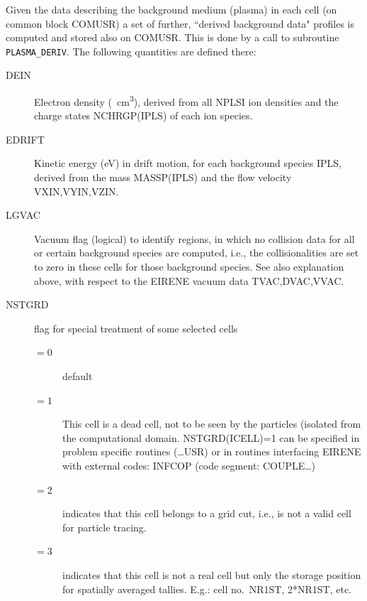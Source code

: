 Given the data describing the background medium (plasma) in each cell (on
common block COMUSR) a set of further, ``derived background data" profiles is
computed and stored also on COMUSR.
This is done by a call to subroutine \lstinline|PLASMA_DERIV|.
The following quantities are defined there:
\begin{description}
  \item[DEIN] Electron density (\si{\per\cubic\centi\metre}), derived from all
        NPLSI ion densities and the charge states NCHRGP(IPLS) of each ion species.
  \item[EDRIFT] Kinetic energy (\si{\electronvolt}) in drift motion, for each
        background species IPLS, derived from the mass MASSP(IPLS) and the flow
        velocity VXIN,VYIN,VZIN.
  \item[LGVAC] Vacuum flag (logical) to identify regions, in which no collision
        data for all or certain background species are computed, i.e., the
        collisionalities are set to zero in these cells for those background species.
        See also explanation above, with respect to the EIRENE vacuum data
        TVAC,DVAC,VVAC.
  \item[NSTGRD] flag for special treatment of some selected cells
        \begin{description}
          \item[$= 0$] default
          \item[$= 1$] This cell is a dead cell,
                not to be seen by the particles (isolated from the computational domain.
                NSTGRD(ICELL)=1 can be specified in problem specific routines (\dots USR) or in
                routines interfacing EIRENE with external codes: INFCOP (code segment:
                COUPLE\dots)
          \item[$= 2$] indicates that this cell belongs to a grid cut, i.e.,
                is not a valid cell for particle tracing.
          \item[$= 3$] indicates that this cell is not a real cell but only the storage
                position for spatially averaged tallies.
                E.g.: cell no.\ NR1ST, 2*NR1ST, etc.
        \end{description}
\end{description}

